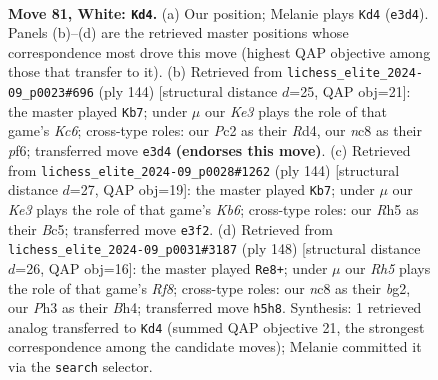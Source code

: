 \documentclass[11pt]{article}
\begin{document}
\clearpage

\begin{figure}[p]\centering
\begin{subfigure}{0.46\textwidth}\centering
\resizebox{\linewidth}{!}{%
\newchessgame
\chessboard[
  setfen={2n5/6r1/P1k5/7R/8/2pBK1PP/2P5/8 w - - 1 81},
  showmover=false,
  pgfstyle=straightmove, color=movearrow, markmove={e3-d4}
]}
\caption{}
\end{subfigure}\hfill
\begin{subfigure}{0.46\textwidth}\centering
\resizebox{\linewidth}{!}{%
\newchessgame
\chessboard[
  setfen={8/8/1BK2pk1/P3r3/3R2P1/8/8/8 w - - 15 73},
  showmover=false,
  pgfstyle=straightmove, color=movearrow, markmove={c6-b7}
]}
\caption{}
\end{subfigure}
\\[4pt]
\begin{subfigure}{0.46\textwidth}\centering
\resizebox{\linewidth}{!}{%
\newchessgame
\chessboard[
  setfen={7r/P4k2/1K6/2B5/6pP/8/5P2/8 w - - 0 73},
  showmover=false,
  pgfstyle=straightmove, color=movearrow, markmove={b6-b7}
]}
\caption{}
\end{subfigure}\hfill
\begin{subfigure}{0.46\textwidth}\centering
\resizebox{\linewidth}{!}{%
\newchessgame
\chessboard[
  setfen={5R2/8/4k3/2K4p/2P4B/1r4P1/6b1/8 w - - 39 75},
  showmover=false,
  pgfstyle=straightmove, color=movearrow, markmove={f8-e8}
]}
\caption{}
\end{subfigure}
\caption{\textbf{Move 81, White: \texttt{Kd4}.} (a) Our position; Melanie plays \texttt{Kd4} (\texttt{e3d4}). Panels (b)--(d) are the retrieved master positions whose correspondence most drove this move (highest QAP objective among those that transfer to it). (b) Retrieved from \texttt{lichess\_elite\_2024-09\_p0023\#696} (ply 144) [structural distance $d$=25, QAP obj=21]: the master played \texttt{Kb7}; under $\mu$ our \emph{Ke3} plays the role of that game's \emph{Kc6}; cross-type roles: our \emph{P}c2 as their \emph{R}d4, our \emph{n}c8 as their \emph{p}f6; transferred move \texttt{e3d4} \textbf{(endorses this move)}. (c) Retrieved from \texttt{lichess\_elite\_2024-09\_p0028\#1262} (ply 144) [structural distance $d$=27, QAP obj=19]: the master played \texttt{Kb7}; under $\mu$ our \emph{Ke3} plays the role of that game's \emph{Kb6}; cross-type roles: our \emph{R}h5 as their \emph{B}c5; transferred move \texttt{e3f2}. (d) Retrieved from \texttt{lichess\_elite\_2024-09\_p0031\#3187} (ply 148) [structural distance $d$=26, QAP obj=16]: the master played \texttt{Re8+}; under $\mu$ our \emph{Rh5} plays the role of that game's \emph{Rf8}; cross-type roles: our \emph{n}c8 as their \emph{b}g2, our \emph{P}h3 as their \emph{B}h4; transferred move \texttt{h5h8}. Synthesis: 1 retrieved analog transferred to \texttt{Kd4} (summed QAP objective 21, the strongest correspondence among the candidate moves); Melanie committed it via the \texttt{search} selector.}
\label{fig:thought-m160}
\end{figure}
\end{document}
